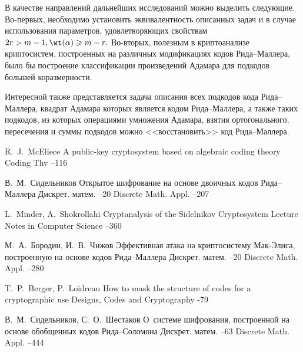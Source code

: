 В качестве направлений дальнейших исследований можно выделить следующие.
Во-первых, необходимо установить эквивалентность описанных задач и в случае использования параметров, удовлетворяющих свойствам \(2r>m-1, \wt(\alpha) \geqslant m-r.\) Во-вторых, полезным в криптоанализе криптосистем, построенных на различных модификациях кодов Рида--Маллера, было бы построение классификации произведений Адамара для подкодов большей коразмерности.

Интересной также представляется задача описания всех подкодов кода Рида--Маллера, квадрат Адамара которых является кодом Рида--Маллера, а также таких подкодов, из которых операциями умножения Адамара, взятия ортогонального, пересечения и суммы подкодов можно <<восстановить>> код Рида--Маллера.

\begin{thebibliography}{99}

	\by R.~J.~McEliece
	\paper A public-key cryptosystem based on algebraic coding theory
	\jour Coding Thv
	--116

	\by В.~М.~Сидельников
	\paper Открытое шифрование на основе двоичных кодов Рида--Маллера
	\jour Дискрет.
	матем.
	--20
	\transl
	\jour Discrete Math.
	Appl.
	--207

	\by L.~Minder, A.~Shokrollahi
	\paper Cryptanalysis of the Sidelnikov Cryptosystem
	\jour Lecture Notes in Computer Science
	--360

	\by М.~А.~Бородин, И.~В.~Чижов
	\paper Эффективная атака на криптосистему Мак-Элиса, построенную на основе кодов Рида--Маллера
	\jour Дискрет.
	матем.
	--20
	\transl
	\jour Discrete Math.
	Appl.
	--280

	\by T.~P.~Berger, P.~Loidreau
	\paper How to mask the structure of codes for a cryptographic use
	\jour Designs, Codes and Cryptography
	-79

	\by В.~М.~Сидельников, С.~О.~Шестаков
	\paper О~системе шифрования, построенной на основе обобщенных кодов Рида--Соломона
	\jour Дискрет.
	матем.
	--63
	\transl
	\jour Discrete Math.
	Appl.
	--444


\end{thebibliography}
